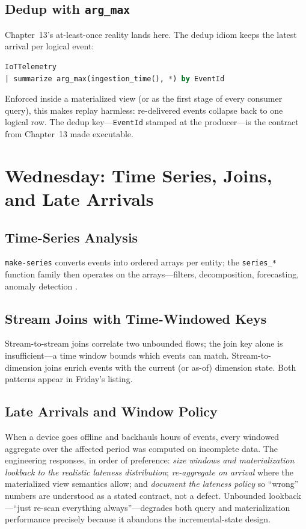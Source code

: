 \subsection{Dedup with \texttt{arg\_max}}
Chapter~13's at-least-once reality lands here. The dedup idiom keeps the latest arrival per logical event:

\begin{lstlisting}[language=SQL,caption={Deduplication idiom: latest arrival per event id.},label={lst:chapter14-dedup}]
IoTTelemetry
| summarize arg_max(ingestion_time(), *) by EventId
\end{lstlisting}

Enforced inside a materialized view (or as the first stage of every consumer query), this makes replay harmless: re-delivered events collapse back to one logical row. The dedup key---\texttt{EventId} stamped at the producer---is the contract from Chapter~13 made executable.

\section{Wednesday: Time Series, Joins, and Late Arrivals}
\subsection{Time-Series Analysis}
\texttt{make-series} converts events into ordered arrays per entity; the \texttt{series\_*} function family then operates on the arrays---filters, decomposition, forecasting, anomaly detection \cite{microsoftKQL}.

\subsection{Stream Joins with Time-Windowed Keys}
Stream-to-stream joins correlate two unbounded flows; the join key alone is insufficient---a time window bounds which events can match. Stream-to-dimension joins enrich events with the current (or as-of) dimension state. Both patterns appear in Friday's listing.

\subsection{Late Arrivals and Window Policy}
When a device goes offline and backhauls hours of events, every windowed aggregate over the affected period was computed on incomplete data. The engineering responses, in order of preference: \emph{size windows and materialization lookback to the realistic lateness distribution}; \emph{re-aggregate on arrival} where the materialized view semantics allow; and \emph{document the lateness policy} so ``wrong'' numbers are understood as a stated contract, not a defect. Unbounded lookback---``just re-scan everything always''---degrades both query and materialization performance precisely because it abandons the incremental-state design.

